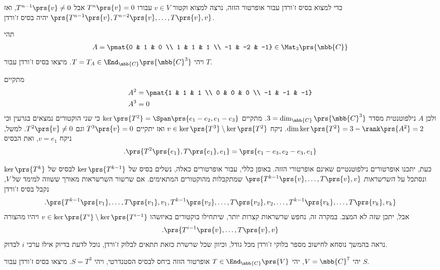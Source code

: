 \documentclass[a4paper,10pt,twoside,openany]{book}
\begin{document}
כדי למצוא בסיס ז'ורדן עבור אופרטור הזזה, נרצה למצוא וקטור
$v \in V$
עבורו
$T^n\prs{v} = 0$
אבל
$T^{n-1}\prs{v} \neq 0$,
ואז
$\prs{T^{n-1}\prs{v}, T^{n-2}\prs{v}, \ldots, T\prs{v}, v}$
יהיה בסיס ז'ורדן.

\begin{exercisechap}
תהי
\begin{align*}
A = \pmat{0 & 1 & 0 \\ 1 & 1 & 1 \\ -1 & -2 & -1} \in \Mat_3\prs{\mbb{C}}
\end{align*}
ויהי
$T = T_A \in \End_{\mbb{C}}\prs{\mbb{C}^3}$.
מיצאו בסיס ז'ורדן עבור
$T$.
\end{exercisechap}

\begin{solution}
מתקיים
\begin{align*}
A^2 &= \pmat{1 & 1 & 1 \\ 0 & 0 & 0 \\ -1 & -1 & -1} \\
A^3 &= 0
\end{align*}
ולכן
$A$
נילפוטנטית מסדר
$3 = \dim_{\mbb{C}}\prs{\mbb{C}^3}$.
מתקיים
$\ker\prs{T^2} = \Span\prs{e_1 - e_2, e_1 - e_3}$
כי שני הוקטורים נמצאים בגרעין וכי
$\dim\ker\prs{T^2} = 3 - \rank\prs{A^2} = 2$.
ניקח
$v \in \ker\prs{T^3} \setminus \ker\prs{T^2}$
ואז יתקיים
$T^3\prs{v} = 0$
וגם
$T^2\prs{v} \neq 0$.
למשל, ניקח
$v = e_1$,
ואת הבסיס
\[\text{.} \prs{T^2\prs{e_1}, T\prs{e_1}, e_1} = \prs{e_1 - e_3, e_2 - e_3, e_1}\]
\end{solution}

כעת, יתכנו אופרטורים נילפוטנטיים שאינם אופרטורי הזזה. באופן כללי, עבור אופרטורים כאלה, נשלים בסיס של
$\ker\prs{T^{k-1}}$
לבסיס של
$\ker\prs{T^k}$
ונסתכל על
\emph{השרשראות}
$\prs{T^{k-1}\prs{v}, \ldots, T\prs{v}, v}$
שמתקבלות מהוקטורים המתאימים. אם שרשור השרשראות מאורך ששווה למימד של
$V$,
נקבל בסיס ז'ורדן
\[\text{.}\prs{T^{k-1}\prs{v_1}, \ldots, T\prs{v_1}, v_1, T^{k-1}\prs{v_2}, \ldots, T\prs{v_2}, v_2, \ldots, T^{k-1}\prs{v_k}, \ldots, T\prs{v_k}, v_k}\]
אבל, יתכן שזה לא המצב. במקרה זה, נחפש שרשראות קצרות יותר, שיתחילו בוקטורים באיזשהו
$v \in \ker\prs{T^i} \setminus \ker\prs{T^{i-1}}$
ויהיו מהצורה
\[\text{.} \prs{T^{i-1}\prs{v}, \ldots, T\prs{v}, v}\]
נראה בהמשך נוסחא לחישוב מספר בלוקי ז'ורדן מכל גודל, וכיוון שכל שרשרת כזאת תתאים לבלוק ז'ורדן, נוכל לדעת בדיוק אילו ערכי
$i$
לבדוק.

\begin{exercisechap}
יהי
$V = \mbb{C}^7$,
יהי
$T \in \End_{\mbb{C}}\prs{V}$
אופרטור הזזה ביחס לבסיס הסטנדרטי, ויהי
$S = T^3$.
מיצאו בסיס ז'ורדן עבור
$S$.
\end{exercisechap}
\end{document}
